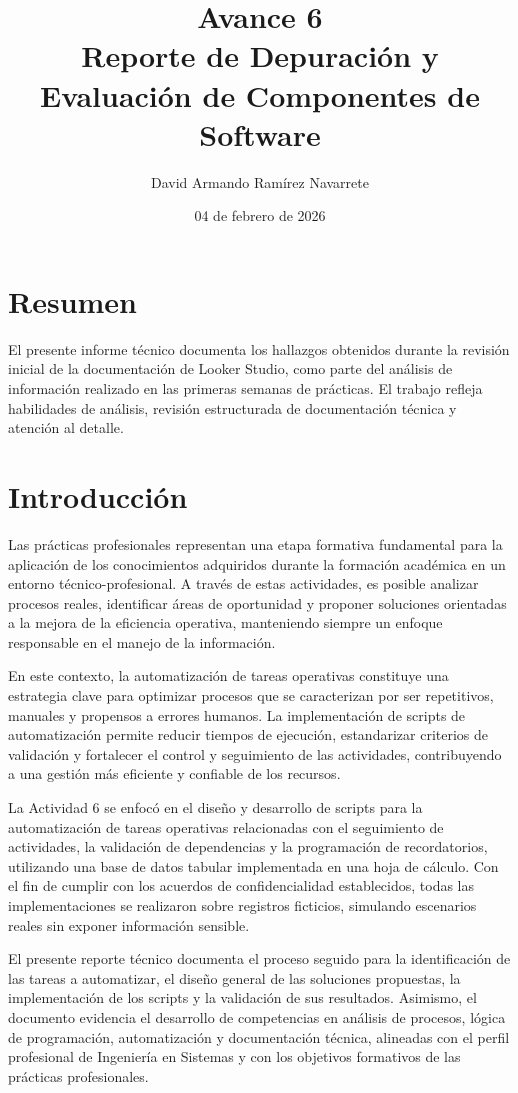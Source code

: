 \documentclass[12pt]{article}
\title{Avance 6 \\ Reporte de Depuración y Evaluación de Componentes de Software}
\author{David Armando Ramírez Navarrete}
\date{04 de febrero de 2026}
\begin{document}
\maketitle

\section*{Resumen}
El presente informe técnico documenta los hallazgos obtenidos durante la revisión inicial de la documentación de Looker Studio, como parte del análisis de información realizado en las primeras semanas de prácticas. El trabajo refleja habilidades de análisis, revisión estructurada de documentación técnica y atención al detalle.

\section*{Introducción}

Las prácticas profesionales representan una etapa formativa fundamental para la aplicación de los conocimientos adquiridos durante la formación académica en un entorno técnico-profesional. A través de estas actividades, es posible analizar procesos reales, identificar áreas de oportunidad y proponer soluciones orientadas a la mejora de la eficiencia operativa, manteniendo siempre un enfoque responsable en el manejo de la información.

En este contexto, la automatización de tareas operativas constituye una estrategia clave para optimizar procesos que se caracterizan por ser repetitivos, manuales y propensos a errores humanos. La implementación de scripts de automatización permite reducir tiempos de ejecución, estandarizar criterios de validación y fortalecer el control y seguimiento de las actividades, contribuyendo a una gestión más eficiente y confiable de los recursos.

La Actividad 6 se enfocó en el diseño y desarrollo de scripts para la automatización de tareas operativas relacionadas con el seguimiento de actividades, la validación de dependencias y la programación de recordatorios, utilizando una base de datos tabular implementada en una hoja de cálculo. Con el fin de cumplir con los acuerdos de confidencialidad establecidos, todas las implementaciones se realizaron sobre registros ficticios, simulando escenarios reales sin exponer información sensible.

El presente reporte técnico documenta el proceso seguido para la identificación de las tareas a automatizar, el diseño general de las soluciones propuestas, la implementación de los scripts y la validación de sus resultados. Asimismo, el documento evidencia el desarrollo de competencias en análisis de procesos, lógica de programación, automatización y documentación técnica, alineadas con el perfil profesional de Ingeniería en Sistemas y con los objetivos formativos de las prácticas profesionales.
\end{document}
